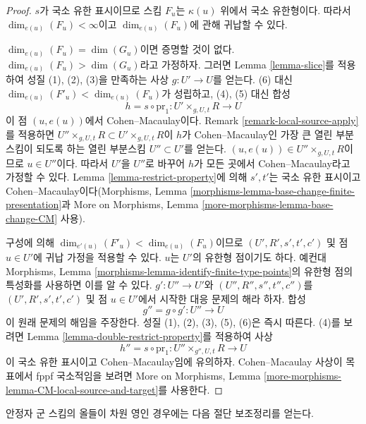 \begin{proof}
$s$가 국소 유한 표시이므로 스킴 $F_u$는 $\kappa(u)$ 위에서 국소 유한형이다.
따라서 $\dim_{e(u)}(F_u) < \infty$이고 $\dim_{e(u)}(F_u)$에 관해 귀납할 수 있다.

\medskip\noindent
$\dim_{e(u)}(F_u) = \dim(G_u)$이면 증명할 것이 없다.
$\dim_{e(u)}(F_u) > \dim(G_u)$라고 가정하자. 그러면 Lemma
\ref{lemma-slice}를 적용하여 성질 (1), (2), (3)을 만족하는 사상
$g : U' \to U$를 얻는다. (6) 대신
$\dim_{e(u)}(F'_u) < \dim_{e(u)}(F_u)$가 성립하고, (4), (5) 대신 합성
$$
h = s \circ \text{pr}_1 : U' \times_{g, U, t} R \longrightarrow U
$$
이 점 $(u, e(u))$에서 Cohen--Macaulay이다. Remark
\ref{remark-local-source-apply}를 적용하면
$U'' \times_{g, U, t} R \subset U' \times_{g, U, t} R$이 $h$가
Cohen--Macaulay인 가장 큰 열린 부분스킴이 되도록 하는 열린 부분스킴
$U'' \subset U'$를 얻는다. $(u, e(u)) \in U'' \times_{g, U, t} R$이므로
$u \in U''$이다. 따라서 $U'$을 $U''$로 바꾸어 $h$가 모든 곳에서
Cohen--Macaulay라고 가정할 수 있다. Lemma \ref{lemma-restrict-property}에 의해
$s', t'$는 국소 유한 표시이고 Cohen--Macaulay이다(Morphisms, Lemma
\ref{morphisms-lemma-base-change-finite-presentation}과 More on Morphisms, Lemma
\ref{more-morphisms-lemma-base-change-CM} 사용).

\medskip\noindent
구성에 의해 $\dim_{e'(u)}(F'_u) < \dim_{e(u)}(F_u)$이므로
$(U', R', s', t', c')$ 및 점 $u \in U'$에 귀납 가정을 적용할 수 있다.
$u$는 $U'$의 유한형 점이기도 하다. 예컨대 Morphisms, Lemma
\ref{morphisms-lemma-identify-finite-type-points}의 유한형 점의 특성화를 사용하면
이를 알 수 있다. $g' : U'' \to U'$와 $(U'', R'', s'', t'', c'')$를
$(U', R', s', t', c')$ 및 점 $u \in U'$에서 시작한 대응 문제의 해라 하자.
합성
$$
g'' = g \circ g' : U'' \longrightarrow U
$$
이 원래 문제의 해임을 주장한다. 성질 (1), (2), (3), (5), (6)은 즉시 따른다.
(4)를 보려면 Lemma \ref{lemma-double-restrict-property}를 적용하여 사상
$$
h'' = s \circ \text{pr}_1 : U'' \times_{g'', U, t} R \longrightarrow U
$$
이 국소 유한 표시이고 Cohen--Macaulay임에 유의하자. Cohen--Macaulay 사상이
목표에서 fppf 국소적임을 보려면 More on Morphisms, Lemma
\ref{more-morphisms-lemma-CM-local-source-and-target}를 사용한다.
\end{proof}

\noindent
안정자 군 스킴의 올들이 차원 영인 경우에는 다음 절단 보조정리를 얻는다.

